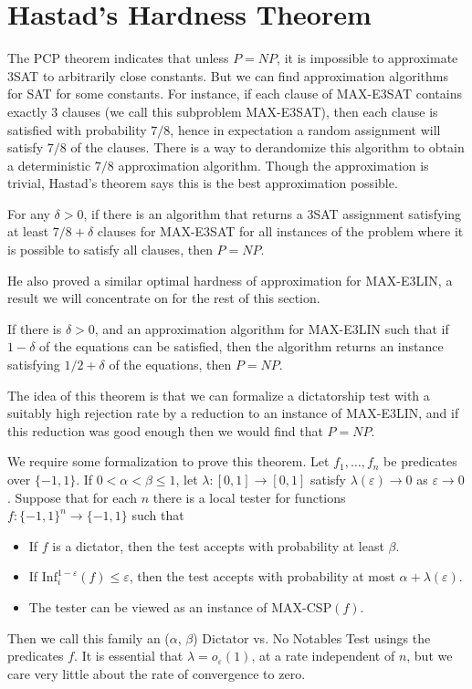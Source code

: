 \section{Hastad's Hardness Theorem}

The PCP theorem indicates that unless $P = NP$, it is impossible to approximate 3SAT to arbitrarily close constants. But we can find approximation algorithms for SAT for some constants. For instance, if each clause of MAX-E3SAT contains exactly 3 clauses (we call this subproblem MAX-E3SAT), then each clause is satisfied with probability $7/8$, hence in expectation a random assignment will satisfy $7/8$ of the clauses. There is a way to derandomize this algorithm to obtain a deterministic $7/8$ approximation algorithm. Though the approximation is trivial, Hastad's theorem says this is the best approximation possible.

\begin{theorem}[Hastad]
    For any $\delta > 0$, if there is an algorithm that returns a 3SAT assignment satisfying at least $7/8 + \delta$ clauses for MAX-E3SAT for all instances of the problem where it is possible to satisfy all clauses, then $P = NP$.
\end{theorem}

He also proved a similar optimal hardness of approximation for MAX-E3LIN, a result we will concentrate on for the rest of this section.

\begin{theorem}[Hastad]
    If there is $\delta > 0$, and an approximation algorithm for MAX-E3LIN such that if $1 - \delta$ of the equations can be satisfied, then the algorithm returns an instance satisfying $1/2 + \delta$ of the equations, then $P = NP$.
\end{theorem}

The idea of this theorem is that we can formalize a dictatorship test with a suitably high rejection rate by a reduction to an instance of MAX-E3LIN, and if this reduction was good enough then we would find that $P = NP$.

We require some formalization to prove this theorem. Let $f_1, \dots, f_n$ be predicates over $\{ -1, 1 \}$. If $0 < \alpha < \beta \leq 1$, let $\lambda: [0,1] \to [0,1]$ satisfy $\lambda(\varepsilon) \to 0$ as $\varepsilon \to 0$. Suppose that for each $n$ there is a local tester for functions $f: \{ -1, 1 \}^n \to \{ -1, 1 \}$ such that
%
\begin{itemize}
    \item If $f$ is a dictator, then the test accepts with probability at least $\beta$.
    \item If $\text{Inf}_i^{1 - \varepsilon}(f) \leq \varepsilon$, then the test accepts with probability at most $\alpha + \lambda(\varepsilon)$.
    \item The tester can be viewed as an instance of MAX-CSP$(f)$.
\end{itemize}
%
Then we call this family an {($\alpha$, $\beta$) Dictator vs. No Notables Test usings the predicates $f$}. It is essential that $\lambda = o_\varepsilon(1)$, at a rate independent of $n$, but we care very little about the rate of convergence to zero.

